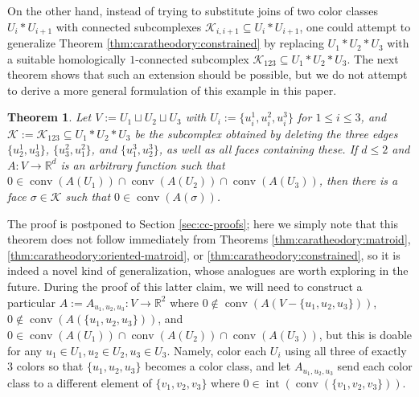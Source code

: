 \documentclass[a4paper,11pt,reqno, english]{amsart}
\newtheorem{theorem}{Theorem}[section]
\theoremstyle{definition}
\theoremstyle{remark}
\newcommand\R{\mathbb R}
\DeclareMathOperator{\interior}{\mathrm{int}}
\DeclareMathOperator{\conv}{\mathrm{conv}}
\begin{document}
On the other hand, instead of trying to substitute joins of two color classes $U_i*U_{i+1}$ with connected subcomplexes $\mathscr{K}_{i,i+1}\subseteq U_i*U_{i+1}$, one could attempt to generalize Theorem \ref{thm:caratheodory:constrained} by replacing $U_1*U_2*U_3$ with a suitable homologically $1$-connected subcomplex $\mathscr{K}_{123}\subseteq U_1*U_2*U_3$. The next theorem shows that such an extension should be possible, but we do not attempt to derive a more general formulation of this example in this paper.
\begin{theorem}\label{thm:caratheodory:3-joined}
    Let $V:=U_1\sqcup U_2\sqcup U_3$ with $U_i:=\{u_i^1,u_i^2,u_i^3\}$ for $1\leq i\leq 3$, and $\mathscr{K}:=\mathscr{K}_{123}\subseteq U_1*U_2*U_3$ be the subcomplex obtained by deleting the three edges $\{u_2^1,u_3^1\}$, $\{u_3^2,u_1^2\}$, and $\{u_1^3,u_2^3\}$, as well as all faces containing these. If $d\leq 2$ and $A\colon V\to\R^d$ is an arbitrary function such that $0\in\conv(A(U_1))\cap\conv(A(U_2))\cap\conv(A(U_3))$, then there is a face $\sigma\in\mathscr{K}$ such that $0\in\conv(A(\sigma))$.
\end{theorem}
The proof is postponed to Section \ref{sec:cc-proofs}; here we simply note that this theorem does not follow immediately from Theorems \ref{thm:caratheodory:matroid}, \ref{thm:caratheodory:oriented-matroid}, or \ref{thm:caratheodory:constrained}, so it is indeed a novel kind of generalization, whose analogues are worth exploring in the future. During the proof of this latter claim, we will need to construct a particular $A:=A_{u_1,u_2,u_3}\colon V\to\R^2$ where $0\notin\conv(A(V-\{u_1,u_2,u_3\}))$, $0\notin\conv(A(\{u_1,u_2,u_3\}))$, and $0\in\conv(A(U_1))\cap\conv(A(U_2))\cap\conv(A(U_3))$, but this is doable for any $u_1\in U_1, u_2\in U_2,u_3\in U_3$. Namely, color each $U_i$ using all three of exactly $3$ colors so that $\{u_1,u_2,u_3\}$ becomes a color class, and let $A_{u_1,u_2,u_3}$ send each color class to a different element of $\{v_1,v_2,v_3\}$ where $0\in\interior(\conv(\{v_1,v_2,v_3\}))$.
\end{document}
